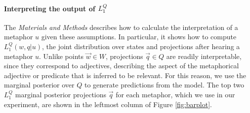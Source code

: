 \documentclass[9pt,twocolumn,twoside,lineno]{pnas-new}
\newcommand{\Listener}{L}
\newcommand{\QLONE}{\Listener_{{1}}^{{Q}}}
\begin{document}


\paragraph{Interpreting the output of $\protect\QLONE$}

	The \emph{Materials and Methods} describes how to calculate the interpretation of a metaphor $u$ given these assumptions. In particular, it shows how to compute $\QLONE(w,q|u)$, the joint distribution over states and projections after hearing a metaphor $u$. Unlike points $\overrightarrow{w}\in W$, projections $\overrightarrow{q}\in Q$ are readily interpretable, since they correspond to adjectives, describing the aspect of the metaphorical adjective or predicate that is inferred to be relevant.
	For this reason, we use the marginal posterior over $Q$ to generate predictions from the model. The top two $\QLONE$ marginal posterior projections $\overrightarrow{q}$ for each metaphor, which we use in our experiment, are shown in the leftmost column of Figure \ref{fig:barplot}. 

\end{document}
